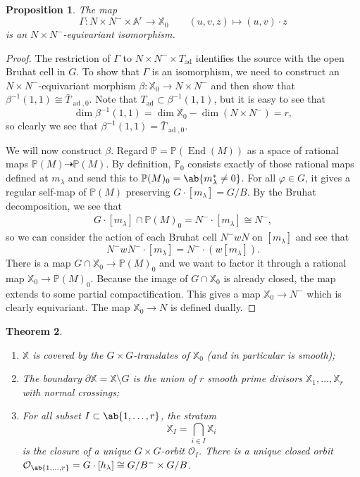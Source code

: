 \documentclass{amsart}
\newtheorem{thm}{Theorem}[section]
\newtheorem{prop}[thm]{Proposition}
\theoremstyle{definition}
\theoremstyle{remark}
\theoremstyle{plain}
\theoremstyle{definition}
\theoremstyle{remark}
\newcommand{\A}{\mathbb{A}}
\renewcommand{\P}{\mathbb{P}}
\newcommand{\mc}[1]{\mathcal{#1}}
\newcommand{\mbb}[1]{\mathbb{#1}}
\newcommand{\1}{\mathbf{1}}
\newcommand{\2}{\mathbf{2}}
\newcommand{\3}{\mathbf{3}}
\DeclareMathOperator{\End}{End}
\DeclareMathOperator{\ad}{ad}
\begin{document}
\begin{prop}
    The map 
    \[ \Gamma \colon N \times N^- \times \A^r \to \mbb{X}_0 \qquad (u, v, z) \mapsto (u,v) \cdot z \]
    is an \(N \times N^-\)-equivariant isomorphism.
\end{prop}

\begin{proof}
    The restriction of \(\Gamma\) to \(N \times N^- \times T_{\ad}\) identifies the source with the open Bruhat cell in \(G\). To show that \(\Gamma\) is an isomorphism, we need to construct an \(N \times N^-\)-equivariant morphism \(\beta \colon \mbb{X}_0 \to N \times N^-\) and then show that \(\beta^{-1}(1,1) \cong \bar{T}_{\ad, 0}\). Note that \(T_{\ad} \subset \beta^{-1}(1,1)\), but it is easy to see that
    \[ \dim \beta^{-1}(1,1) = \dim \mbb{X}_0 - \dim (N \times N^-) = r, \]
    so clearly we see that \(\beta^{-1}(1,1) = \bar{T}_{\ad, 0}\).

    We will now construct \(\beta\). Regard \(\P = \P(\End(M))\) as a space of rational maps \(\P(M) \dashrightarrow \P(M)\). By definition, \(\P_0\) consists exactly of those rational maps defined at \(m_{\lambda}\) and send this to \(\P(M)_0 = \ab\{ m_{\lambda}^* \neq 0\}\). For all \(\varphi \in G\), it gives a regular self-map of \(\P(M)\) preserving \(G \cdot [m_{\lambda}] = G/B\). By the Bruhat decomposition, we see that
    \begin{align*}
        G \cdot [m_{\lambda}] \cap \P(M)_0 = N^- \cdot [m_{\lambda}] \cong N^-,
    \end{align*}
    so we can consider the action of each Bruhat cell \(N^- w N\) on \([m_{\lambda}]\) and see that
    \[ N^- w N^- \cdot [m_{\lambda}] = N^- \cdot (w [m_{\lambda}]). \]
    There is a map \(G \cap \mbb{X}_0 \to \P(M)_0\) and we want to factor it through a rational map \(\mbb{X}_0 \to \P(M)_0\). Because the image of \(G \cap \mbb{X}_0\) is already closed, the map extends to some partial compactification. This gives a map \(\mbb{X}_0 \to N^-\) which is clearly equivariant. The map \(\mbb{X}_0 \to N\) is defined dually.
\end{proof}

\begin{thm}\leavevmode
    \begin{enumerate}
        \item \(\mbb{X}\) is covered by the \(G \times G\)-translates of \(\mbb{X}_0\) (and in particular is smooth);
        \item The boundary \(\partial \mbb{X} = \mbb{X} \setminus G\) is the union of \(r\) smooth prime divisors \(\mbb{X}_1, \ldots, \mbb{X}_r\) with normal crossings; 
        \item For all subset \(I \subset \ab\{ 1, \ldots, r\}\), the stratum
        \[ \mbb{X}_I = \bigcap_{i \in I} \mbb{X}_i \]
        is the closure of a unique \(G \times G\)-orbit \(\mc{O}_I\). There is a unique closed orbit \(\mc{O}_{\ab\{1, \ldots, r\}} = G \cdot [h_{\lambda}] \cong G / B^- \times G/B\).  
    \end{enumerate} 
\end{thm}
\end{document}
